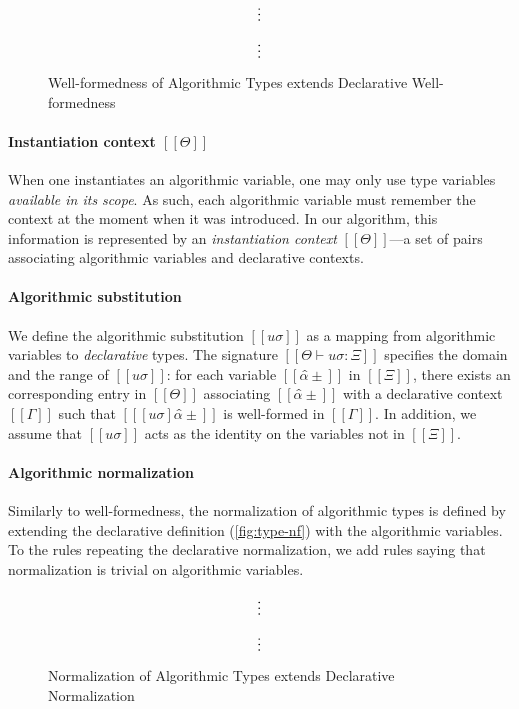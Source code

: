 \begin{figure}[t]
  \begin{minipage}{0.49\textwidth}
  $$\vcenter{\hbox{\vdots}}$$
  \ottusedrule{\ottdruleWFATPUVarLabeled{}}
  \end{minipage}
  \begin{minipage}{0.49\textwidth}
  $$\vcenter{\hbox{\vdots}}$$
  \ottusedrule{\ottdruleWFATNUVarLabeled{}}
  \end{minipage}
\caption{Well-formedness of Algorithmic Types extends Declarative Well-formedness}
\label{fig:algo-wf}
\end{figure}

\paragraph*{Instantiation context $[[Θ]]$}
When one instantiates an algorithmic variable, one may only use type variables
\emph{available in its scope}. As such, each algorithmic variable must remember
the context at the moment when it was introduced. In our algorithm, this
information is represented by an \emph{instantiation context} $[[Θ]]$---a set of
pairs associating algorithmic variables and declarative contexts.

\paragraph*{Algorithmic substitution}
We define the algorithmic substitution $[[uσ]]$ as a mapping from algorithmic
variables to \emph{declarative} types. The signature $[[Θ ⊢ uσ : Ξ]]$
specifies the domain and the range of $[[uσ]]$: for each variable $[[α̂±]]$
in $[[Ξ]]$, there exists an corresponding entry in $[[Θ]]$ associating 
$[[α̂±]]$ with a declarative context $[[Γ]]$ such that $[[ [uσ]α̂± ]]$
is well-formed in $[[Γ]]$. In addition, we assume that $[[uσ]]$
acts as the identity on the variables not in $[[Ξ]]$.


\paragraph*{Algorithmic normalization}
Similarly to well-formedness, the normalization of algorithmic types is defined
by extending the declarative definition (\cref{fig:type-nf}) with the
algorithmic variables. To the rules repeating the declarative normalization, we
add rules saying that normalization is trivial on algorithmic variables.

\begin{figure}[t]
\begin{minipage}{0.49\textwidth}
  $$\vcenter{\hbox{\vdots}}$$
  \ottusedrule{\ottdruleNrmPUVar{}}
\end{minipage}
\hfill
\begin{minipage}{0.49\textwidth}
  $$\vcenter{\hbox{\vdots}}$$
  \ottusedrule{\ottdruleNrmNUVar{}}
\end{minipage}
\caption{Normalization of Algorithmic Types extends Declarative Normalization}
\label{fig:algo-nf}
\end{figure}

